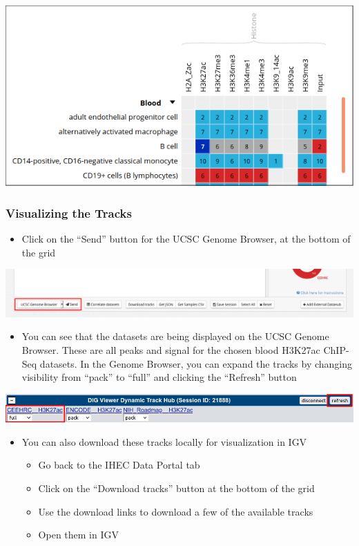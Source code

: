 \documentclass[
]{book}
\providecommand{\tightlist}{%
  \setlength{\itemsep}{0pt}\setlength{\parskip}{0pt}}
\begin{document}
\includegraphics{./img/portal_blood_h3k27ac.png}

\subsubsection{Visualizing the Tracks}\label{visualizing-the-tracks}

\begin{itemize}
\tightlist
\item
  Click on the ``Send'' button for the UCSC Genome Browser, at the bottom of the grid
\end{itemize}

\includegraphics{./img/portal_send_to_ucsc.png}

\begin{itemize}
\tightlist
\item
  You can see that the datasets are being displayed on the UCSC Genome Browser. These are all peaks and signal for the chosen blood H3K27ac ChIP-Seq datasets. In the Genome Browser, you can expand the tracks by changing visibility from ``pack'' to ``full'' and clicking the ``Refresh'' button
\end{itemize}

\includegraphics{./img/ucsc_fullTrackView.png}

\begin{itemize}
\tightlist
\item
  You can also download these tracks locally for visualization in IGV

  \begin{itemize}
  \tightlist
  \item
    Go back to the IHEC Data Portal tab
  \item
    Click on the ``Download tracks'' button at the bottom of the grid
  \item
    Use the download links to download a few of the available tracks
  \item
    Open them in IGV
  \end{itemize}
\end{itemize}
\end{document}
